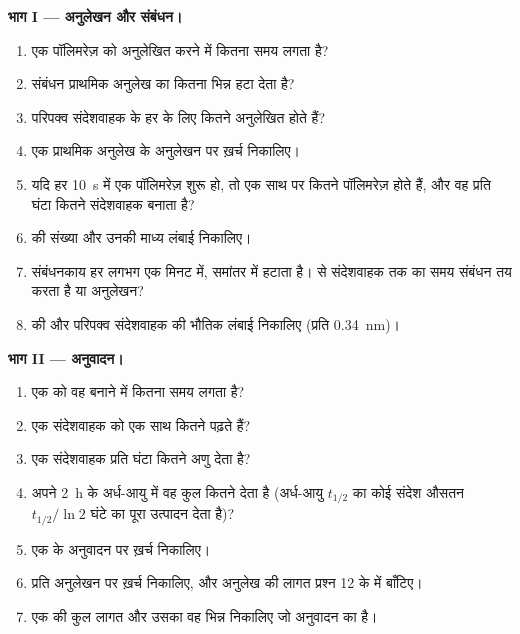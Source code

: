 \begin{problem}
\medskip
\noindent\textbf{भाग I --- अनुलेखन और संबंधन।}
\begin{enumerate}
  \item एक पॉलिमरेज़ को  अनुलेखित करने में कितना समय लगता है?
  \item संबंधन प्राथमिक अनुलेख का कितना भिन्न हटा देता है?
  \item परिपक्व संदेशवाहक के हर  के लिए कितने
         अनुलेखित होते हैं?
  \item एक प्राथमिक अनुलेख के अनुलेखन पर ख़र्च  निकालिए।
  \item यदि हर \qty{10}{s} में एक पॉलिमरेज़ शुरू हो, तो एक साथ  पर
        कितने पॉलिमरेज़ होते हैं, और वह  प्रति घंटा कितने संदेशवाहक
        बनाता है?
  \item {} की संख्या और उनकी माध्य लंबाई निकालिए।
  \item संबंधनकाय हर  लगभग एक मिनट में, समांतर में हटाता है।
         से संदेशवाहक तक का समय संबंधन तय करता है या अनुलेखन?
  \item {} की और परिपक्व संदेशवाहक की भौतिक लंबाई निकालिए
        (प्रति  \qty{0.34}{nm})।
\end{enumerate}

\medskip
\noindent\textbf{भाग II --- अनुवादन।}
\begin{enumerate}[resume]
  \item एक  को वह  बनाने में कितना समय लगता है?
  \item एक संदेशवाहक को एक साथ कितने  पढ़ते हैं?
  \item एक संदेशवाहक प्रति घंटा कितने  अणु देता है?
  \item अपने \qty{2}{h} के अर्ध-आयु में वह कुल कितने देता है
        (अर्ध-आयु $t_{1/2}$ का कोई संदेश औसतन
        $t_{1/2}/\ln 2$ घंटे का पूरा उत्पादन देता है)?
  \item एक  के अनुवादन पर ख़र्च  निकालिए।
  \item प्रति  अनुलेखन पर ख़र्च  निकालिए, और अनुलेख की लागत
        प्रश्न 12 के  में बाँटिए।
  \item एक  की कुल लागत और उसका वह भिन्न निकालिए जो अनुवादन का
        है।
\end{enumerate}


\end{problem}
